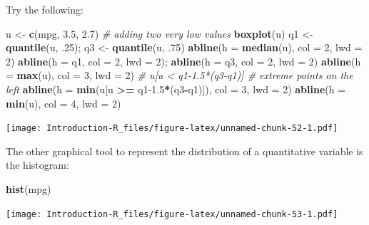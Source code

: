 \documentclass[]{book}
\newenvironment{Shaded}{\begin{snugshade}}{\end{snugshade}}
\newcommand{\CommentTok}[1]{\textcolor[rgb]{0.56,0.35,0.01}{\textit{#1}}}
\newcommand{\DataTypeTok}[1]{\textcolor[rgb]{0.13,0.29,0.53}{#1}}
\newcommand{\DecValTok}[1]{\textcolor[rgb]{0.00,0.00,0.81}{#1}}
\newcommand{\FloatTok}[1]{\textcolor[rgb]{0.00,0.00,0.81}{#1}}
\newcommand{\KeywordTok}[1]{\textcolor[rgb]{0.13,0.29,0.53}{\textbf{#1}}}
\newcommand{\NormalTok}[1]{#1}
\newcommand{\OperatorTok}[1]{\textcolor[rgb]{0.81,0.36,0.00}{\textbf{#1}}}
\newcommand{\StringTok}[1]{\textcolor[rgb]{0.31,0.60,0.02}{#1}}
\begin{document}
Try the following:

\begin{Shaded}
\begin{Highlighting}[]
\NormalTok{u <-}\StringTok{ }\KeywordTok{c}\NormalTok{(mpg, }\FloatTok{3.5}\NormalTok{, }\FloatTok{2.7}\NormalTok{) }\CommentTok{# adding two very low values}
\KeywordTok{boxplot}\NormalTok{(u)}
\NormalTok{q1 <-}\StringTok{ }\KeywordTok{quantile}\NormalTok{(u, }\FloatTok{.25}\NormalTok{); q3 <-}\StringTok{ }\KeywordTok{quantile}\NormalTok{(u, }\FloatTok{.75}\NormalTok{)}
\KeywordTok{abline}\NormalTok{(}\DataTypeTok{h =} \KeywordTok{median}\NormalTok{(u), }\DataTypeTok{col =} \DecValTok{2}\NormalTok{, }\DataTypeTok{lwd =} \DecValTok{2}\NormalTok{)}
\KeywordTok{abline}\NormalTok{(}\DataTypeTok{h =}\NormalTok{ q1, }\DataTypeTok{col =} \DecValTok{2}\NormalTok{, }\DataTypeTok{lwd =} \DecValTok{2}\NormalTok{); }\KeywordTok{abline}\NormalTok{(}\DataTypeTok{h =}\NormalTok{ q3, }\DataTypeTok{col =} \DecValTok{2}\NormalTok{, }\DataTypeTok{lwd =} \DecValTok{2}\NormalTok{)}
\KeywordTok{abline}\NormalTok{(}\DataTypeTok{h =} \KeywordTok{max}\NormalTok{(u), }\DataTypeTok{col =} \DecValTok{3}\NormalTok{, }\DataTypeTok{lwd =} \DecValTok{2}\NormalTok{)}
\CommentTok{# u[u < q1-1.5*(q3-q1)] # extreme points on the left}
\KeywordTok{abline}\NormalTok{(}\DataTypeTok{h =} \KeywordTok{min}\NormalTok{(u[u }\OperatorTok{>=}\StringTok{ }\NormalTok{q1}\FloatTok{-1.5}\OperatorTok{*}\NormalTok{(q3}\OperatorTok{-}\NormalTok{q1)]), }\DataTypeTok{col =} \DecValTok{3}\NormalTok{, }\DataTypeTok{lwd =} \DecValTok{2}\NormalTok{)}
\KeywordTok{abline}\NormalTok{(}\DataTypeTok{h =} \KeywordTok{min}\NormalTok{(u), }\DataTypeTok{col =} \DecValTok{4}\NormalTok{, }\DataTypeTok{lwd =} \DecValTok{2}\NormalTok{)}
\end{Highlighting}
\end{Shaded}

\texttt{[image: Introduction-R\_files/figure-latex/unnamed-chunk-52-1.pdf]}

The other graphical tool to represent the distribution of a quantitative variable is the histogram:

\begin{Shaded}
\begin{Highlighting}[]
\KeywordTok{hist}\NormalTok{(mpg)}
\end{Highlighting}
\end{Shaded}

\texttt{[image: Introduction-R\_files/figure-latex/unnamed-chunk-53-1.pdf]}
\end{document}
